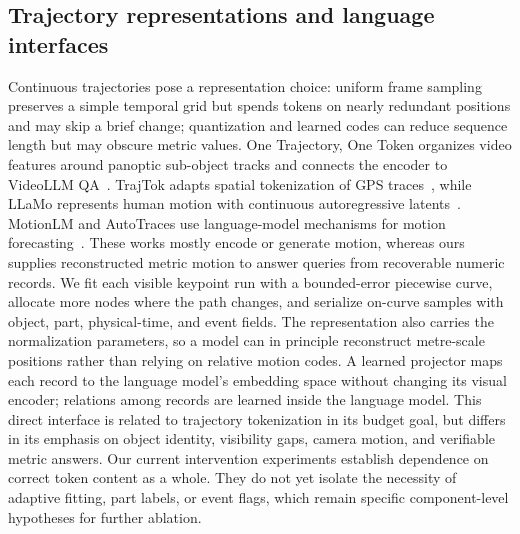 \subsection{Trajectory representations and language interfaces}
Continuous trajectories pose a representation choice: uniform frame sampling preserves a simple temporal grid but spends tokens on nearly redundant positions and may skip a brief change; quantization and learned codes can reduce sequence length but may obscure metric values. One Trajectory, One Token organizes video features around panoptic sub-object tracks and connects the encoder to VideoLLM QA~\citep{zhengOneTrajectoryOneToken2025}. TrajTok adapts spatial tokenization of GPS traces~\citep{xiongTrajTokAdaptiveSpatial2026}, while LLaMo represents human motion with continuous autoregressive latents~\citep{liLLaMoScaling2026}. MotionLM and AutoTraces use language-model mechanisms for motion forecasting~\citep{seffMotionLMMultiAgentMotion2023,wangAutoTracesAutoregressiveTrajectory}. These works mostly encode or generate motion, whereas ours supplies reconstructed metric motion to answer queries from recoverable numeric records. We fit each visible keypoint run with a bounded-error piecewise curve, allocate more nodes where the path changes, and serialize on-curve samples with object, part, physical-time, and event fields. The representation also carries the normalization parameters, so a model can in principle reconstruct metre-scale positions rather than relying on relative motion codes. A learned projector maps each record to the language model's embedding space without changing its visual encoder; relations among records are learned inside the language model. This direct interface is related to trajectory tokenization in its budget goal, but differs in its emphasis on object identity, visibility gaps, camera motion, and verifiable metric answers. Our current intervention experiments establish dependence on correct token content as a whole. They do not yet isolate the necessity of adaptive fitting, part labels, or event flags, which remain specific component-level hypotheses for further ablation.
